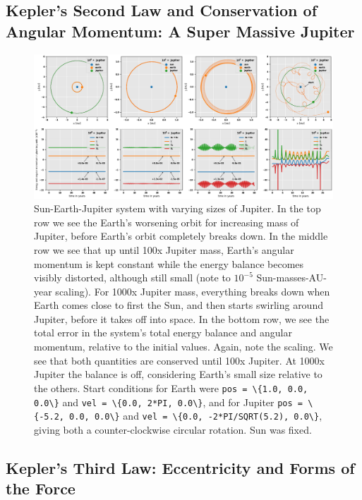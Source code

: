 \documentclass[]{article}
\begin{document}
\subsection{Kepler's Second Law and Conservation of Angular Momentum: A Super Massive Jupiter}



\begin{figure}[!htb]
	\centering
	\includegraphics[width=1\linewidth]{massive-jupiter.png}
	\caption{Sun-Earth-Jupiter system with varying sizes of Jupiter. In the top row we see the Earth's worsening orbit for increasing mass of Jupiter, before Earth's orbit completely breaks down. In the middle row we see that up until 100x Jupiter mass, Earth's angular momentum is kept constant while the energy balance becomes visibly distorted, although still small (note to $10^{-5}$ Sun-masses-AU-year scaling). For 1000x Jupiter mass, everything breaks down when Earth comes close to first the Sun, and then starts swirling around Jupiter, before it takes off into space. In the bottom row, we see the total error in the system's total energy balance and angular momentum, relative to the initial values. Again, note the scaling. We see that both quantities are conserved until 100x Jupiter. At 1000x Jupiter the balance is off, considering Earth's small size relative to the others. Start conditions for Earth were \lstinline|pos = \{1.0, 0.0, 0.0\}| and \lstinline|vel = \{0.0, 2*PI, 0.0\}|, and for Jupiter \lstinline|pos = \{-5.2, 0.0, 0.0\}| and \lstinline|vel = \{0.0, -2*PI/SQRT(5.2), 0.0\}|, giving both a counter-clockwise circular rotation. Sun was fixed.}
	\label{fig:massive-jupiter}
\end{figure}

\subsection{Kepler's Third Law: Eccentricity and Forms of the Force}
\end{document}
